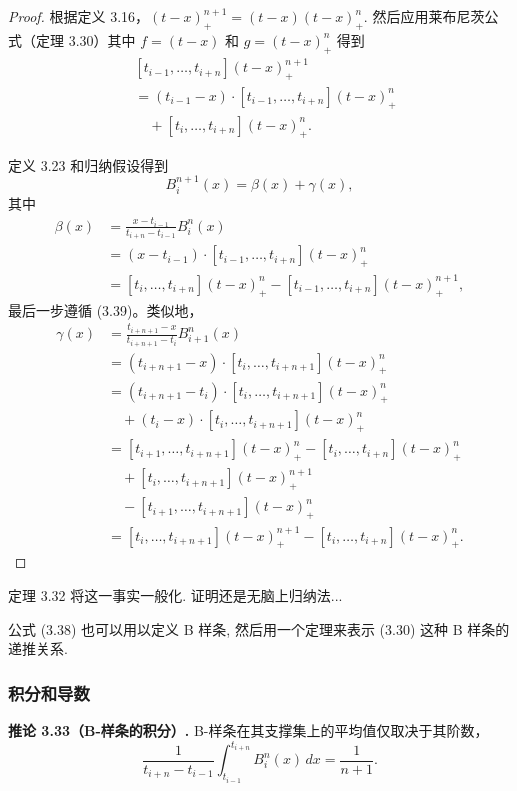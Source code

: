 \documentclass[a4paper]{ctexart}
\begin{document}
{\begin{proof}
根据定义 3.16，$(t - x)_+^{n + 1} = (t - x)(t - x)_+^n$. 然后应用莱布尼茨公式（定理 3.30）其中 $f=(t - x)$ 和 $g=(t - x)_+^n$ 
得到
\begin{align*}
  &[t_{i-1}, \ldots, t_{i+n}](t-x)_+^{n+1} \\
  &= (t_{i-1} - x) \cdot [t_{i-1}, \ldots, t_{i+n}](t-x)_+^n \\
  &\quad + [t_i, \ldots, t_{i+n}](t-x)_+^n.
\end{align*}
  
定义 3.23 和归纳假设得到
\[
  B_{i}^{n+1}(x) = \beta(x) + \gamma(x),
\]
其中
\begin{align*}
  \beta(x) &= \frac{x - t_{i-1}}{t_{i+n} - t_{i-1}} B_{i}^{n}(x) \\
  &= (x - t_{i-1}) \cdot [t_{i-1}, \ldots, t_{i+n}](t-x)_+^n \\
  &= [t_{i}, \ldots, t_{i+n}](t-x)_+^n - [t_{i-1}, \ldots, t_{i+n}](t-x)_+^{n+1},
\end{align*}
最后一步遵循 (3.39)。类似地，
\begin{align*}
  \gamma(x) &= \frac{t_{i+n+1} - x}{t_{i+n+1} - t_{i}} B_{i+1}^{n}(x) \\
  &= (t_{i+n+1} - x) \cdot [t_{i}, \ldots, t_{i+n+1}](t-x)_+^n \\
  &= (t_{i+n+1} - t_{i}) \cdot [t_{i}, \ldots, t_{i+n+1}](t-x)_+^n \\
  &\quad + (t_{i} - x) \cdot [t_{i}, \ldots, t_{i+n+1}](t-x)_+^n \\
  &= [t_{i+1}, \ldots, t_{i+n+1}](t-x)_+^n - [t_{i}, \ldots, t_{i+n}](t-x)_+^n \\
  &\quad + [t_{i}, \ldots, t_{i+n+1}](t-x)_+^{n+1} \\
  &\quad - [t_{i+1}, \ldots, t_{i+n+1}](t-x)_+^n \\
  &= [t_{i}, \ldots, t_{i+n+1}](t-x)_+^{n+1} - [t_{i}, \ldots, t_{i+n}](t-x)_+^n.
\end{align*}
\end{proof}

定理 3.32 将这一事实一般化. 证明还是无脑上归纳法...

公式 (3.38) 也可以用以定义 B 样条, 然后用一个定理来表示 (3.30) 这种 B
样条的递推关系. 

\subsubsection{积分和导数}

\noindent \textbf{推论 3.33（B-样条的积分）.} B-样条在其支撑集上的平均值仅取决于其阶数，
\[
\frac{1}{t_{i+n} - t_{i-1}} \int_{t_{i-1}}^{t_{i+n}} B_{i}^{n}(x) \, dx = \frac{1}{n+1}.
\tag{3.40}
\]

}
\end{document}
